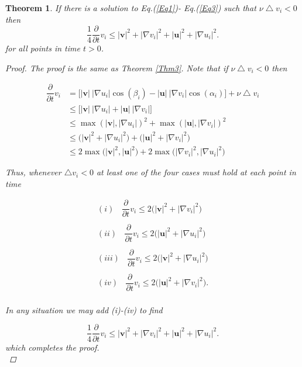 \documentclass[amsmath,12pt,a4paper]{amsart}
\newtheorem{theorem}{Theorem}
\begin{document}
\begin{theorem}\label{Thm4}
If there is a solution to Eq.(\ref{Eq1})- Eq.(\ref{Eq3})  such that $\nu \bigtriangleup v_i < 0 $ then  $$
\dfrac{1}{4}\dfrac{\partial}{\partial t} v_i \le |\textbf{v}|^2+ |\nabla v_i |^2 + |\textbf{u}|^2+  |\nabla u_i|^2.
$$ for all points in time $t>0$.
\begin{proof}
The proof is the same as Theorem \ref{Thm3}. Note that if $\nu \bigtriangleup v_i < 0 $ then 

\begin{equation}\label{Eq26}
\begin{split}
\dfrac{\partial}{\partial t} v_i &  = \biggl[|\textbf{v}|~|\nabla u_i|\cos(\beta_i)- |\textbf{u}|~|\nabla v_i|\cos(\alpha_i)\biggr]+  \nu \bigtriangleup v_i\\
& \le  \biggl[|\textbf{v}|~|\nabla u_i|+ |\textbf{u}|~|\nabla v_i|\biggr]\\
& \le \max(|\textbf{v}|, |\nabla u_i |)^2 + \max(|\textbf{u}|, |\nabla v_i |)^2 \\
& \le \biggl(|\textbf{v}|^2 + |\nabla u_i|^2\biggr) + \biggl(|\textbf{u}|^2 + |\nabla v_i|^2\biggr)\\
&\le  2\max\biggl(|\textbf{v}|^2, |\textbf{u}|^2\biggr) +  2\max\biggl(|\nabla v_i|^2, |\nabla u_i|^2\biggr) 
\end{split}
\end{equation}

Thus, whenever $\bigtriangleup v_i< 0$ at least one of the four cases must hold at each point in time

\begin{equation}\label{Eq27}
\begin{split}
(i)~~~~\dfrac{\partial}{\partial t} v_i\le 2 \biggl(|\textbf{v}|^2 + |\nabla v_i|^2  \biggr) \\
\\
(ii)~~~~\dfrac{\partial}{\partial t} v_i\le 2 \biggl(|\textbf{u}|^2 + |\nabla u_i|^2  \biggr)\\
\\
(iii)~~~~\dfrac{\partial}{\partial t} v_i\le 2 \biggl(|\textbf{v}|^2 + |\nabla u_i|^2  \biggr) \\
\\
(iv)~~~~\dfrac{\partial}{\partial t} v_i\le 2 \biggl(|\textbf{u}|^2 + |\nabla v_i|^2  \biggr). \\
\end{split}
\end{equation}

In any situation we may add (i)-(iv) to find 
 
 \begin{equation}\label{Eq28}
\dfrac{1}{4}\dfrac{\partial}{\partial t} v_i \le |\textbf{v}|^2+ |\nabla v_i |^2 + |\textbf{u}|^2+  |\nabla u_i|^2.
 \end{equation}
which completes the proof.\\
\end{proof}
\end{theorem}
\end{document}
